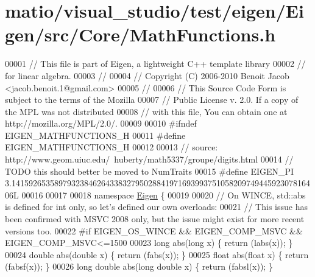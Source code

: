\hypertarget{matio_2visual__studio_2test_2eigen_2_eigen_2src_2_core_2_math_functions_8h_source}{}\section{matio/visual\+\_\+studio/test/eigen/\+Eigen/src/\+Core/\+Math\+Functions.h}
\label{matio_2visual__studio_2test_2eigen_2_eigen_2src_2_core_2_math_functions_8h_source}

\begin{DoxyCode}
00001 \textcolor{comment}{// This file is part of Eigen, a lightweight C++ template library}
00002 \textcolor{comment}{// for linear algebra.}
00003 \textcolor{comment}{//}
00004 \textcolor{comment}{// Copyright (C) 2006-2010 Benoit Jacob <jacob.benoit.1@gmail.com>}
00005 \textcolor{comment}{//}
00006 \textcolor{comment}{// This Source Code Form is subject to the terms of the Mozilla}
00007 \textcolor{comment}{// Public License v. 2.0. If a copy of the MPL was not distributed}
00008 \textcolor{comment}{// with this file, You can obtain one at http://mozilla.org/MPL/2.0/.}
00009 
00010 \textcolor{preprocessor}{#ifndef EIGEN\_MATHFUNCTIONS\_H}
00011 \textcolor{preprocessor}{#define EIGEN\_MATHFUNCTIONS\_H}
00012 
00013 \textcolor{comment}{// source: http://www.geom.uiuc.edu/~huberty/math5337/groupe/digits.html}
00014 \textcolor{comment}{// TODO this should better be moved to NumTraits}
00015 \textcolor{preprocessor}{#define EIGEN\_PI 3.141592653589793238462643383279502884197169399375105820974944592307816406L}
00016 
00017 
00018 \textcolor{keyword}{namespace }\hyperlink{namespace_eigen}{Eigen} \{
00019 
00020 \textcolor{comment}{// On WINCE, std::abs is defined for int only, so let's defined our own overloads:}
00021 \textcolor{comment}{// This issue has been confirmed with MSVC 2008 only, but the issue might exist for more recent versions
       too.}
00022 \textcolor{preprocessor}{#if EIGEN\_OS\_WINCE && EIGEN\_COMP\_MSVC && EIGEN\_COMP\_MSVC<=1500}
00023 \textcolor{keywordtype}{long}        abs(\textcolor{keywordtype}{long}        x) \{ \textcolor{keywordflow}{return} (labs(x));  \}
00024 \textcolor{keywordtype}{double}      abs(\textcolor{keywordtype}{double}      x) \{ \textcolor{keywordflow}{return} (fabs(x));  \}
00025 \textcolor{keywordtype}{float}       abs(\textcolor{keywordtype}{float}       x) \{ \textcolor{keywordflow}{return} (fabsf(x)); \}
00026 \textcolor{keywordtype}{long} \textcolor{keywordtype}{double} abs(\textcolor{keywordtype}{long} \textcolor{keywordtype}{double} x) \{ \textcolor{keywordflow}{return} (fabsl(x)); \}

\end{DoxyCode}
